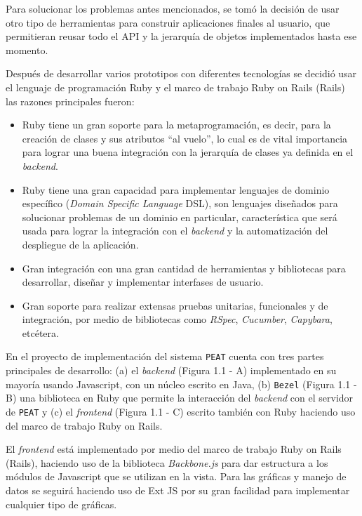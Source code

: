 Para solucionar los problemas antes mencionados, se tomó la decisión de
usar otro tipo de herramientas para construir aplicaciones finales al usuario,
que permitieran reusar todo el API y la jerarquía de objetos implementados
hasta ese momento.

Después de desarrollar varios prototipos con diferentes tecnologías se decidió
usar el lenguaje de programación Ruby y el marco de trabajo Ruby on Rails (Rails)
las razones principales fueron:

\begin{itemize}
\item Ruby tiene un gran soporte para la metaprogramación, es decir, para la
  creación de clases y sus atributos ``al vuelo'', lo cual es de vital
  importancia para lograr una buena integración con la jerarquía de clases
  ya definida en el \textit{backend}.
\item Ruby tiene una gran capacidad para implementar lenguajes de dominio
  específico (\textit{Domain Specific Language} DSL), son lenguajes diseñados
  para solucionar problemas de un dominio en particular, característica
  que será usada para lograr la integración con el \textit{backend}
  y la automatización del despliegue de la aplicación.
\item Gran integración con una gran cantidad de herramientas y bibliotecas para
  desarrollar, diseñar y implementar interfases de usuario.
\item Gran soporte para realizar extensas pruebas unitarias, funcionales
  y de integración, por medio de bibliotecas como \textit{RSpec}, \textit{Cucumber},
  \textit{Capybara}, etcétera.
\end{itemize}

En el proyecto de implementación del sistema \texttt{PEAT}
cuenta con tres partes principales de desarrollo:
(a) el \textit{backend} (Figura 1.1 - A) implementado en su mayoría usando
Javascript, con un núcleo escrito en Java, (b) \texttt{Bezel} (Figura 1.1 - B)
una biblioteca en Ruby que permite la interacción del \textit{backend}
con el servidor de \texttt{PEAT} y (c) el \textit{frontend} (Figura 1.1 - C) escrito
también con Ruby haciendo uso del marco de trabajo Ruby on Rails.


El \textit{frontend} está implementado por medio del marco de trabajo
Ruby on Rails (Rails), haciendo uso de la biblioteca \textit{Backbone.js}
para dar estructura a los módulos de Javascript que se utilizan en la vista.
Para las gráficas y manejo de datos se seguirá haciendo uso de Ext JS
por su gran facilidad para implementar cualquier tipo de gráficas.

